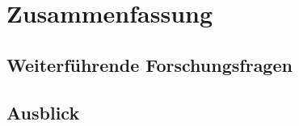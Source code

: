 \chapter{Zusammenfassung}
\label{kap:Kapitel05}
%
\section{Weiterf\"uhrende Forschungsfragen}
%

%
\section{Ausblick}
%

%

